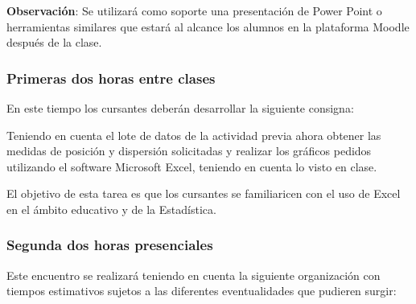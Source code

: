 \textbf{Observación}: Se utilizará como soporte una presentación de Power Point o herramientas similares que estará al alcance los alumnos en la plataforma Moodle después de la clase.

\subsubsection{Primeras dos horas entre clases}

En este tiempo los cursantes deberán desarrollar la siguiente consigna:

\begin{actividad_entre}
	Teniendo en cuenta el lote de datos de la actividad previa ahora obtener las medidas de posición y dispersión solicitadas y realizar los gráficos pedidos utilizando el software Microsoft Excel, teniendo en cuenta lo visto en clase.
\end{actividad_entre}

El objetivo de esta tarea es que los cursantes se familiaricen con el uso de Excel en el ámbito educativo y de la Estadística.

\subsubsection{Segunda dos horas presenciales}

Este encuentro se realizará teniendo en cuenta la siguiente organización con tiempos estimativos sujetos a las diferentes eventualidades que pudieren surgir:

